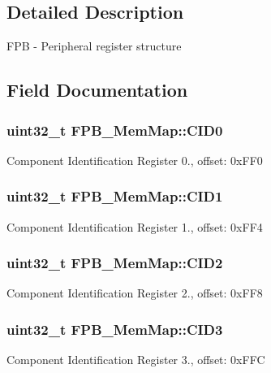 \subsection{Detailed Description}
F\+P\+B -\/ Peripheral register structure 

\subsection{Field Documentation}
\hypertarget{struct_f_p_b___mem_map_ad9aa53125967afe84ec6267d3b147be9}{}
\subsubsection[{C\+I\+D0}]{\setlength{\rightskip}{0pt plus 5cm}uint32\+\_\+t F\+P\+B\+\_\+\+Mem\+Map\+::\+C\+I\+D0}\label{struct_f_p_b___mem_map_ad9aa53125967afe84ec6267d3b147be9}
Component Identification Register 0., offset\+: 0x\+F\+F0 \hypertarget{struct_f_p_b___mem_map_a252a9bf3bd58aa080c9058f8acbc9dd0}{}
\subsubsection[{C\+I\+D1}]{\setlength{\rightskip}{0pt plus 5cm}uint32\+\_\+t F\+P\+B\+\_\+\+Mem\+Map\+::\+C\+I\+D1}\label{struct_f_p_b___mem_map_a252a9bf3bd58aa080c9058f8acbc9dd0}
Component Identification Register 1., offset\+: 0x\+F\+F4 \hypertarget{struct_f_p_b___mem_map_a682979a59af5457d6c388fb11274fd9a}{}
\subsubsection[{C\+I\+D2}]{\setlength{\rightskip}{0pt plus 5cm}uint32\+\_\+t F\+P\+B\+\_\+\+Mem\+Map\+::\+C\+I\+D2}\label{struct_f_p_b___mem_map_a682979a59af5457d6c388fb11274fd9a}
Component Identification Register 2., offset\+: 0x\+F\+F8 \hypertarget{struct_f_p_b___mem_map_a75c3b9a038df70053d980c6ee3d2d821}{}
\subsubsection[{C\+I\+D3}]{\setlength{\rightskip}{0pt plus 5cm}uint32\+\_\+t F\+P\+B\+\_\+\+Mem\+Map\+::\+C\+I\+D3}\label{struct_f_p_b___mem_map_a75c3b9a038df70053d980c6ee3d2d821}
Component Identification Register 3., offset\+: 0x\+F\+F\+C \hypertarget{struct_f_p_b___mem_map_a09cb7f6616d521163b4cc6cf0dbd86b3}{}
